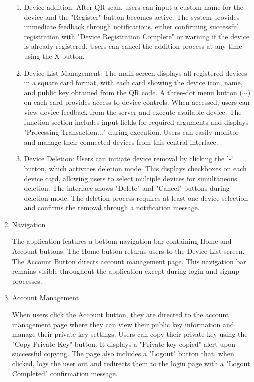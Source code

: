 \documentclass[conference]{IEEEtran}
\begin{document}
\begin{enumerate}[itemsep=2ex, parsep=1ex]
\begin{enumerate}
            \item Device addition: After QR scan, users can input a custom name for the device and the "Register" button becomes active. The system provides immediate feedback through notifications, either confirming successful registration with "Device Registration Complete" or warning if the device is already registered. Users can cancel the addition process at any time using the X button.
            
            \item Device List Management: The main screen displays all registered devices in a square card format, with each card showing the device icon, name, and public key obtained from the QR code. A three-dot menu button ($\cdots$) on each card provides access to device controls. When accessed, users can view device feedback from the server and execute available device. The function section includes input fields for required arguments and displays "Processing Transaction..." during execution. Users can easily monitor and manage their connected devices from this central interface.
            
            \item Device Deletion: Users can initiate device removal by clicking the '-' button, which activates deletion mode. This displays checkboxes on each device card, allowing users to select multiple devices for simultaneous deletion. The interface shows "Delete" and "Cancel" buttons during deletion mode. The deletion process requires at least one device selection and confirms the removal through a notification message.
        \end{enumerate}
        
    \item{Navigation}
        
        The application features a bottom navigation bar containing Home and Account buttons. The Home button returns users to the Device List screen. The Account Button directs account management page. This navigation bar remains visible throughout the application except during login and signup processes.
        
    \item{Account Management}
        
        When users click the Account button, they are directed to the account management page where they can view their public key information and manage their private key settings. Users can copy their private key using the "Copy Private Key" button. It displays a "Private key copied" alert upon successful copying. The page also includes a "Logout" button that, when clicked, logs the user out and redirects them to the login page with a "Logout Completed" confirmation message.
\end{enumerate}
\end{document}
